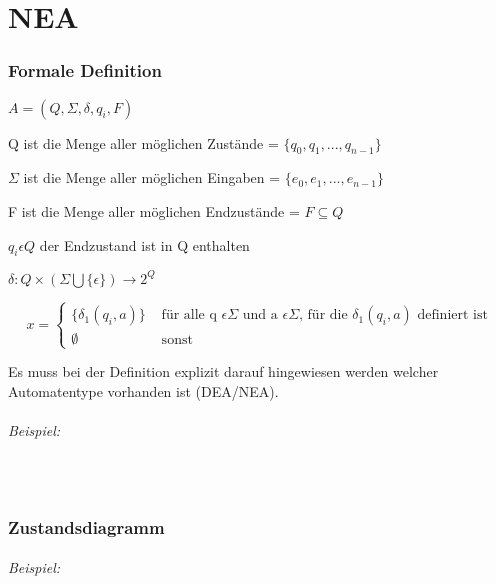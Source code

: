 \part{NEA}

\section{Formale Definition}

$A=(Q,\Sigma,\delta,q_{i},F)$

Q ist die Menge aller möglichen Zustände = $\{q_0,q_1,...,q_{n-1}\}$

$\Sigma$ ist die Menge aller möglichen Eingaben = $\{e_0,e_{1},...,e_{n-1}\}$

F ist die Menge aller möglichen Endzustände = $F\subseteq Q$

$q_{i}\epsilon Q$ der Endzustand ist in Q enthalten

$\delta:Q \times (\Sigma \bigcup \{\epsilon\}) \rightarrow 2^Q$

\[
x = 
\begin{cases}
	\{\delta_1(q_i,a)\} & \text{ für alle q } \epsilon \Sigma \text{ und a } \epsilon \Sigma \text{, für die } \delta_1(q_i,a) \text{ definiert ist} \\
	\emptyset & \text{ sonst}
\end{cases}
\]

Es muss bei der Definition explizit darauf hingewiesen werden welcher Automatentype vorhanden ist (DEA/NEA).

\paragraph{Beispiel:}\mbox{} \\


\section{Zustandsdiagramm}

\paragraph{Beispiel:}\mbox{} \\

